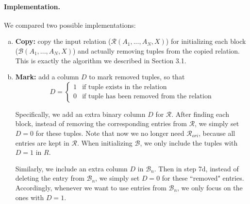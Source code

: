 \paragraph{Implementation.} We compared two possible implementations: 
\begin{enumerate}[(a)]
\item {\bf Copy:} copy the input relation ($\mathcal{R}(A_1, ..., A_N, X)$) for initializing each block ($\mathcal{B}(A_1, ..., A_N, X)$) and actually removing tuples from the copied relation. This is exactly the algorithm we described in Section 3.1.

\item {\bf Mark:} add a column $D$ to mark removed tuples, so that
\[
D = \begin{cases}
1 & \textrm{if tuple exists in the relation}\\
0 &\textrm{if tuple has been removed from the relation}
\end{cases}
\] 

Specifically, we add an extra binary column $D$ for $\mathcal{R}$. After finding each block, instead of removing the corresponding entries from $\mathcal{R}$, we simply set $D=0$ for these tuples.  Note that now we no longer need $\mathcal{R}_{ori}$, because all entries are kept in $\mathcal{R}$. When initializing $\mathcal{B}$, we only include the tuples with $D=1$ in $R$.

Similarly, we include an extra column $D$ in $\mathcal{B}_n$. Then in step 7d, instead of deleting the entry from $\mathcal{B}_n$, we simply set $D=0$ for these ``removed" entries. Accordingly, whenever we want to use entries from $\mathcal{B}_n$, we only focus on the ones with $D=1$.
 \end{enumerate}
 
